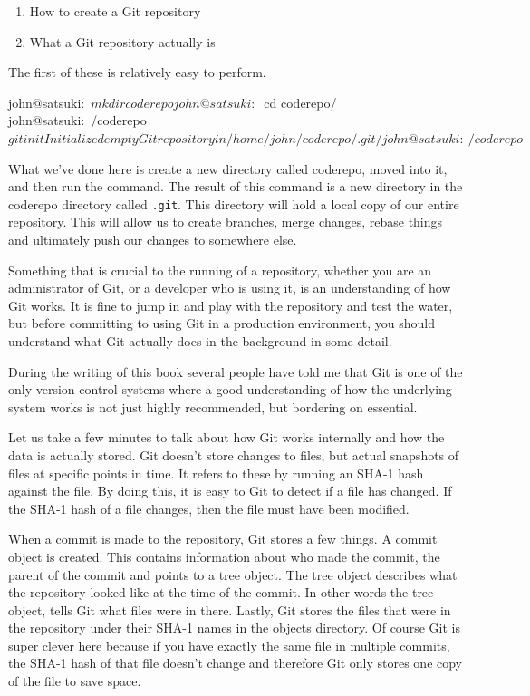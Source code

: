\begin{enumerate}
  \item How to create a Git repository
  \item What a Git repository actually is
\end{enumerate}

The first of these is relatively easy to perform.

\begin{code}
john@satsuki:~$ mkdir coderepo
john@satsuki:~$ cd coderepo/
john@satsuki:~/coderepo$ git init
Initialized empty Git repository in /home/john/coderepo/.git/
john@satsuki:~/coderepo$
\end{code}

What we've done here is create a new directory called coderepo, moved into it, and then run the  command.
The result of this command is a new directory in the coderepo directory called \texttt{.git}.
This directory will hold a local copy of our entire repository.
This will allow us to create branches, merge changes, rebase things and ultimately push our changes to somewhere else.

Something that is crucial to the running of a repository, whether you are an administrator of Git, or a developer who is using it, is an understanding of how Git works.
It is fine to jump in and play with the repository and test the water, but before committing to using Git in a production environment, you should understand what Git actually does in the background in some detail.

During the writing of this book several people have told me that Git is one of the only version control systems where a good understanding of how the underlying system works is not just highly recommended, but bordering on essential.

Let us take a few minutes to talk about how Git works internally and how the data is actually stored.
Git doesn't store changes to files, but actual snapshots of files at specific points in time.
It refers to these by running an SHA-1 hash against the file.
By doing this, it is easy to Git to detect if a file has changed.
If the SHA-1 hash of a file changes, then the file must have been modified.

When a commit is made to the repository, Git stores a few things.
A commit object is created.
This contains information about who made the commit, the parent of the commit and points to a tree object.
The tree object describes what the repository looked like at the time of the commit.
In other words the tree object, tells Git what files were in there.
Lastly, Git stores the files that were in the repository under their SHA-1 names in the objects directory.
Of course Git is super clever here because if you have exactly the same file in multiple commits, the SHA-1 hash of that file doesn't change and therefore Git only stores one copy of the file to save space.


